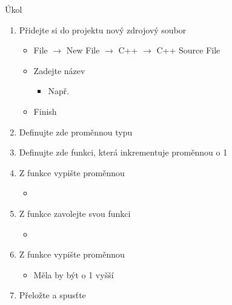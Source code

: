 \begin{frame}{Úkol}

  \begin{enumerate}
    \item Přidejte si do projektu nový zdrojový soubor
    \begin{itemize}
      \item File $\rightarrow$ New File $\rightarrow$ C++ $\rightarrow$ C++
        Source File
      \item Zadejte název
      \begin{itemize}
	\item Např.\ 
      \end{itemize}
      \item Finish
    \end{itemize}

    \item Definujte zde proměnnou typu 

    \item Definujte zde funkci, která inkrementuje proměnnou o 1

    \item Z  funkce vypište proměnnou
    \begin{itemize}
      \item {}
    \end{itemize}

    \item Z  funkce zavolejte svou funkci
    \begin{itemize}
      \item {}
    \end{itemize}

    \item Z  funkce vypište proměnnou
    \begin{itemize}
      \item Měla by být o 1 vyšší
    \end{itemize}

    \item Přeložte a spusťte
  \end{enumerate}

\end{frame}

